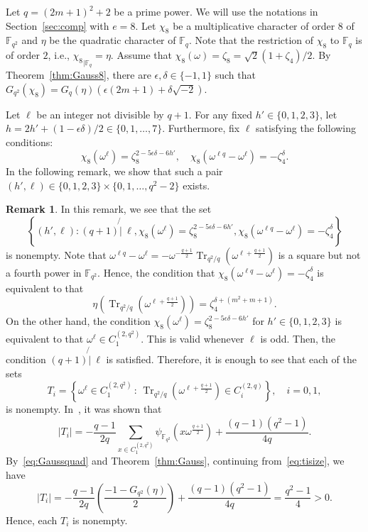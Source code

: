 \documentclass[10pt]{amsart}
\theoremstyle{definition}
\newtheorem{rema}[theo]{Remark}
\DeclareMathOperator{\Tr}{Tr}
\newcommand*\F{{\mathbb F}}
\newcommand*{\notmid}{\mathbin{\not{|}\:}}
\begin{document}
Let $q=(2m+1)^2+2$ be a prime power. We will use the notations in Section~\ref{sec:comp} with $e=8$. Let $\chi_8$ be a multiplicative character of order $8$ of $\F_{q^2}$ and $\eta$ be the quadratic character of $\F_{q}$. Note that the restriction of $\chi_8$ to $\F_q$ is of order $2$, i.e., ${\chi_8}_{|\F_q}=\eta$. Assume that $\chi_8(\omega)=\zeta_8=\sqrt{2}(1+\zeta_4)/2$. By Theorem~\ref{thm:Gauss8}, there are $\epsilon,\delta\in \{-1,1\}$ such that $G_{q^2}(\chi_8)=G_q(\eta)(\epsilon (2m+1)+\delta \sqrt{-2})$.

Let $\ell$ be an integer not divisible by $q+1$. For any fixed $h'\in \{0,1,2,3\}$, let $h=2h'+(1-\epsilon \delta)/2\in \{0,1,\ldots,7\}$. Furthermore, fix $\ell$ satisfying the following conditions:
\begin{equation}\label{eq:cond2}
\chi_8(\omega^\ell)=\zeta_8^{2-5\epsilon \delta-6h'},
\quad
\chi_8(\omega^{\ell q}-\omega^\ell)=-\zeta_4^{\delta}.
\end{equation}
In the following remark, we show that such a pair $(h',\ell)\in \{0,1,2,3\}\times \{0,1,\ldots,q^2-2\}$ exists.

\begin{rema}\label{rem:cond2}
In this remark, we see that the set
\[
\left\{(h',\ell):(q+1) \notmid \ell, \chi_8(\omega^\ell)=\zeta_8^{2-5\epsilon \delta-6h'},\chi_8(\omega^{\ell q}-\omega^\ell)=-\zeta_4^{\delta}\right\}
\]
is nonempty. Note that $\omega^{\ell q}-\omega^\ell=-\omega^{-\frac{q+1}{2}}\Tr_{q^2/q}(\omega^{\ell+\frac{q+1}{2}})$ is a square but not a fourth power in $\F_{q^2}$. Hence, the condition that $\chi_8(\omega^{\ell q}-\omega^\ell)=-\zeta_4^{\delta}$ is equivalent to that
\[
\eta(\Tr_{q^2/q}(\omega^{\ell+\frac{q+1}{2}}))=\zeta_4^{\delta+(m^2+m+1)}.
\]
On the other hand, the condition $\chi_8(\omega^\ell)=\zeta_8^{2-5\epsilon \delta-6h'}$ for $h'\in \{0,1,2,3\}$ is equivalent to that $\omega^\ell\in C_1^{(2,q^2)}$. This is valid whenever $\ell$ is odd. Then, the condition $(q+1)\notmid \ell$ is satisfied. Therefore, it is enough to see that each of the sets
\[
T_i=\left\{\omega^\ell\in C_{1}^{(2,q^2)}\,:\,\Tr_{q^2/q}(\omega^{\ell+\frac{q+1}{2}})\in C_i^{(2,q)}\right\}, \quad i=0,1,
\]
is nonempty. In~\cite[Remark~2]{MS}, it was shown that
\begin{equation}\label{eq:tisize}
|T_i|=-\frac{q-1}{2q}\sum_{x\in C_1^{(2,q^2)}}\psi_{\F_{q^2}}(x\omega^{\frac{q+1}{2}})+\frac{(q-1)(q^2-1)}{4q}.
\end{equation}
By~\eqref{eq:Gaussquad} and Theorem~\ref{thm:Gauss}, continuing from~\eqref{eq:tisize}, we have
\[
|T_i|=-\frac{q-1}{2q}\left(\frac{-1-G_{q^2}(\eta)}{2}\right)+\frac{(q-1)(q^2-1)}{4q}=\frac{q^2-1}{4}>0.
\]
Hence, each $T_i$ is nonempty.
\end{rema}
\end{document}
